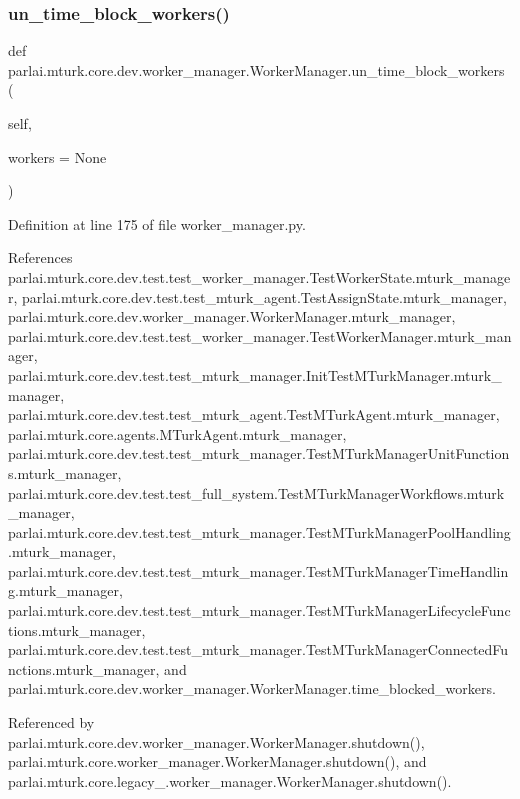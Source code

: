 \subsubsection{\texorpdfstring{un\+\_\+time\+\_\+block\+\_\+workers()}{un\_time\_block\_workers()}}
{\footnotesize\ttfamily def parlai.\+mturk.\+core.\+dev.\+worker\+\_\+manager.\+Worker\+Manager.\+un\+\_\+time\+\_\+block\+\_\+workers (\begin{DoxyParamCaption}\item[{}]{self,  }\item[{}]{workers = {\ttfamily None} }\end{DoxyParamCaption})}



Definition at line 175 of file worker\+\_\+manager.\+py.



References parlai.\+mturk.\+core.\+dev.\+test.\+test\+\_\+worker\+\_\+manager.\+Test\+Worker\+State.\+mturk\+\_\+manager, parlai.\+mturk.\+core.\+dev.\+test.\+test\+\_\+mturk\+\_\+agent.\+Test\+Assign\+State.\+mturk\+\_\+manager, parlai.\+mturk.\+core.\+dev.\+worker\+\_\+manager.\+Worker\+Manager.\+mturk\+\_\+manager, parlai.\+mturk.\+core.\+dev.\+test.\+test\+\_\+worker\+\_\+manager.\+Test\+Worker\+Manager.\+mturk\+\_\+manager, parlai.\+mturk.\+core.\+dev.\+test.\+test\+\_\+mturk\+\_\+manager.\+Init\+Test\+M\+Turk\+Manager.\+mturk\+\_\+manager, parlai.\+mturk.\+core.\+dev.\+test.\+test\+\_\+mturk\+\_\+agent.\+Test\+M\+Turk\+Agent.\+mturk\+\_\+manager, parlai.\+mturk.\+core.\+agents.\+M\+Turk\+Agent.\+mturk\+\_\+manager, parlai.\+mturk.\+core.\+dev.\+test.\+test\+\_\+mturk\+\_\+manager.\+Test\+M\+Turk\+Manager\+Unit\+Functions.\+mturk\+\_\+manager, parlai.\+mturk.\+core.\+dev.\+test.\+test\+\_\+full\+\_\+system.\+Test\+M\+Turk\+Manager\+Workflows.\+mturk\+\_\+manager, parlai.\+mturk.\+core.\+dev.\+test.\+test\+\_\+mturk\+\_\+manager.\+Test\+M\+Turk\+Manager\+Pool\+Handling.\+mturk\+\_\+manager, parlai.\+mturk.\+core.\+dev.\+test.\+test\+\_\+mturk\+\_\+manager.\+Test\+M\+Turk\+Manager\+Time\+Handling.\+mturk\+\_\+manager, parlai.\+mturk.\+core.\+dev.\+test.\+test\+\_\+mturk\+\_\+manager.\+Test\+M\+Turk\+Manager\+Lifecycle\+Functions.\+mturk\+\_\+manager, parlai.\+mturk.\+core.\+dev.\+test.\+test\+\_\+mturk\+\_\+manager.\+Test\+M\+Turk\+Manager\+Connected\+Functions.\+mturk\+\_\+manager, and parlai.\+mturk.\+core.\+dev.\+worker\+\_\+manager.\+Worker\+Manager.\+time\+\_\+blocked\+\_\+workers.



Referenced by parlai.\+mturk.\+core.\+dev.\+worker\+\_\+manager.\+Worker\+Manager.\+shutdown(), parlai.\+mturk.\+core.\+worker\+\_\+manager.\+Worker\+Manager.\+shutdown(), and parlai.\+mturk.\+core.\+legacy\+\_.\+worker\+\_\+manager.\+Worker\+Manager.\+shutdown().


